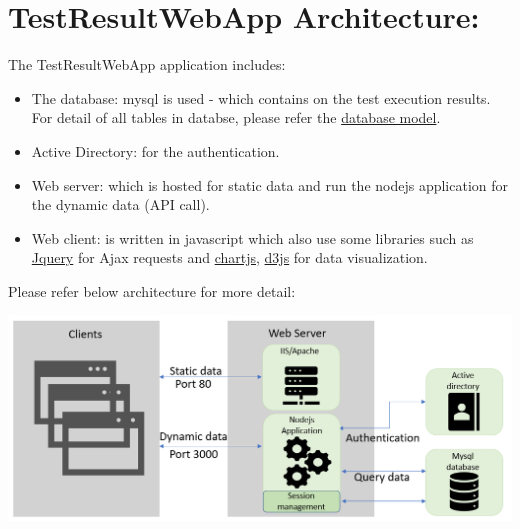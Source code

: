 



\hypertarget{webapp-architecture}{%
\section{TestResultWebApp Architecture:}\label{webapp-architecture}}

The TestResultWebApp application includes:
\begin{itemize}
   \item The database: mysql is used - which contains on the test execution 
         results. For detail of all tables in databse, please refer the 
         \href{https://github.com/test-fullautomation/testresultwebapp/blob/
         develop/TestResultWebApp/mysql_server/datamodel/datamodel.svg}{database
         model}.
   \item Active Directory: for the authentication.
   \item Web server: which is hosted for static data and run the nodejs 
         application for the dynamic data (API call).
   \item Web client: is written in javascript which also use some libraries such 
         as \href{https://jquery.com/}{Jquery} for Ajax requests and 
         \href{https://www.chartjs.org/}{chartjs}, 
         \href{https://d3js.org/}{d3js} for data visualization. 
\end{itemize}

Please refer below architecture for more detail:

\includegraphics[width=1\linewidth]{./pictures/Architechture.png}

